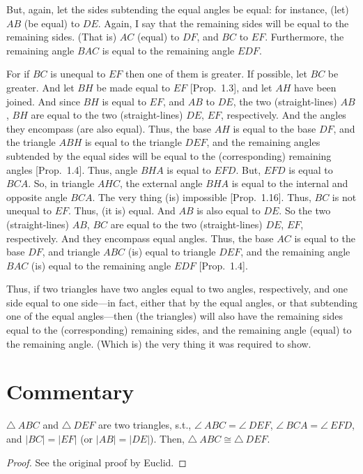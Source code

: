 But, again, let the sides subtending the equal angles be equal: for instance, 
(let) $AB$ (be equal) to
$DE$.  Again, I say that the remaining sides will be equal to the remaining
sides. (That is) $AC$ (equal) to $DF$, and $BC$ to $EF$. Furthermore, the remaining angle
$BAC$ is equal to the remaining angle $EDF$.

For if $BC$ is unequal to $EF$ then one of them is greater. If possible, let $BC$
be greater. And let $BH$ be made equal to $EF$ [Prop.~1.3], and let $AH$ have been joined.
And since $BH$ is equal to $EF$, and $AB$ to $DE$, the two (straight-lines) $AB$, $BH$
are equal to the two (straight-lines) $DE$, $EF$, respectively. And the angles
they encompass (are also equal). Thus, the base $AH$ is equal to the base  
$DF$, and the triangle $ABH$ is equal to the triangle $DEF$, and the
remaining angles subtended by the equal sides will be equal to the
(corresponding) remaining angles [Prop.~1.4]. Thus, angle $BHA$ 
is equal to $EFD$. But, $EFD$ is equal to $BCA$. So, in triangle $AHC$,
the external angle $BHA$ is equal to the internal and opposite angle 
$BCA$. The very thing (is) impossible [Prop.~1.16]. Thus, $BC$ is not unequal to $EF$.
Thus, (it is) equal. And $AB$ is also equal to $DE$. So the two
(straight-lines) $AB$, $BC$ are equal to the two (straight-lines) $DE$, $EF$,
respectively. And they encompass equal angles. Thus, the base $AC$ is equal
to the base $DF$, and triangle $ABC$ (is) equal to triangle $DEF$, and the
remaining angle $BAC$ (is) equal to the remaining angle $EDF$ [Prop.~1.4].

Thus, if two triangles have two angles equal to two angles, respectively, 
and one side equal to one side---in fact, either that by the equal angles, or that
subtending one of the equal angles---then (the triangles) will also have the remaining sides equal to the (corresponding) remaining sides, and the
remaining angle (equal) to the remaining angle. (Which is) the very thing it
was required to show.



\section*{Commentary}

\begin{proposition}\label{proposition_26}\leanok
    $\triangle~ABC$ and $\triangle~DEF$ are two triangles, s.t., $\angle~ABC=\angle~DEF$, $\angle~BCA=\angle~EFD$, and $|BC|=|EF|$ (or $|AB|=|DE|$). Then, $\triangle~ABC\cong\triangle~DEF$.
\end{proposition}
\begin{proof}
    \leanok
    See the original proof by Euclid.
\end{proof}
